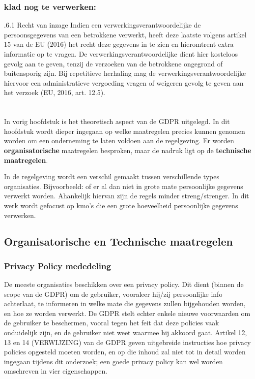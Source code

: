 \subsection{klad nog te verwerken: }
.6.1 Recht van inzage
Indien een verwerkingsverantwoordelijke de persoonsgegevens van een betrokkene verwerkt, heeft deze laatste volgens artikel 15 van de EU (2016) het recht deze gegevens in te
zien en hieromtrent extra informatie op te vragen.
De verwerkingsverantwoordelijke dient hier kosteloos gevolg aan te geven, tenzij de
verzoeken van de betrokkene ongegrond of buitensporig zijn. Bij repetitieve herhaling
mag de verwerkingsverantwoordelijke hiervoor een administratieve vergoeding vragen of
weigeren gevolg te geven aan het verzoek (EU, 2016, art. 12.5).

\chapter{}
\label{ch:Maatregelen}

In vorig hoofdstuk is het theoretisch aspect van de GDPR uitgelegd. In dit hoofdstuk wordt dieper ingegaan op welke maatregelen precies kunnen genomen worden om een onderneming te laten voldoen aan de regelgeving. Er worden \textbf{organisatorische} maatregelen besproken, maar de nadruk ligt op de \textbf{technische maatregelen}.   

In de regelgeving wordt een verschil gemaakt tussen verschillende types organisaties. Bijvoorbeeld: of er al dan niet in grote mate persoonlijke gegevens verwerkt worden. Ahankelijk hiervan zijn de regels minder streng/strenger. In dit werk wordt gefocust op kmo's die een grote hoeveelheid persoonlijke gegevens verwerken. 

\section{Organisatorische en Technische maatregelen}

\subsection{Privacy Policy mededeling}
De meeste organisaties beschikken over een privacy policy. Dit dient (binnen de scope van de GDPR) om de gebruiker, vooraleer hij/zij persoonlijke info achterlaat, te informeren in welke mate die gegevens zullen bijgehouden worden, en hoe ze worden verwerkt. De GDPR stelt echter enkele nieuwe voorwaarden om de gebruiker te beschermen, vooral tegen het feit dat deze policies vaak onduidelijk zijn, en de gebruiker niet weet waarmee hij akkoord gaat.
Artikel 12, 13 en 14 (VERWIJZING) van de GDPR geven uitgebreide instructies hoe privacy policies opgesteld moeten worden, en op die inhoud zal niet tot in detail worden ingegaan tijdens dit onderzoek; een goede privacy policy kan wel worden omschreven in vier eigenschappen. 

